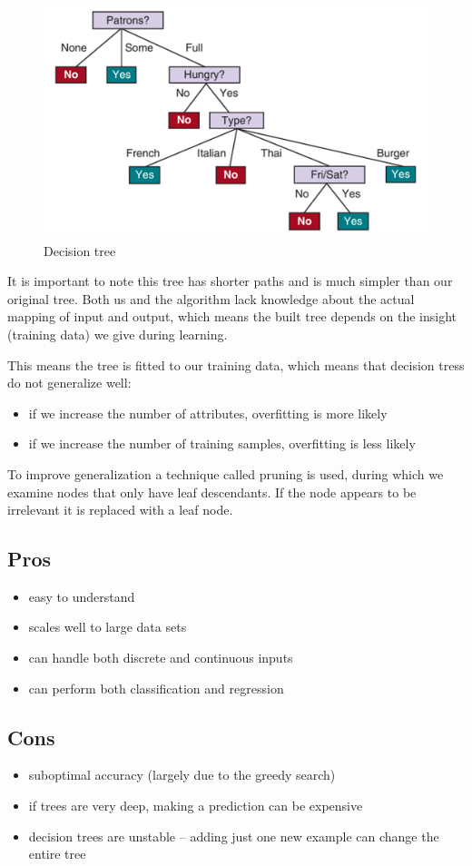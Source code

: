 \documentclass[a4paper,12pt,answers]{article}
\begin{document}
	\begin{figure}[H]
		\centering
		\includegraphics[width=0.7\linewidth]{dec_tree_building2}
		\caption{Decision tree}
		\label{fig:dectreebuilding2}
	\end{figure}
	It is important to note this tree has shorter paths and is much simpler than our original tree. Both us and the algorithm lack knowledge about the actual mapping of input and output, which means the built tree depends on the insight (training data) we give during learning.
	
	This means the tree is fitted to our training data, which means that decision tress do not generalize well:
	\begin{itemize}
		\item if we increase the number of attributes, overfitting is more likely
		\item if we increase the number of training samples, overfitting is less likely
	\end{itemize}
	
	To improve generalization a technique called pruning is used, during which we examine nodes that only have leaf descendants. If the node appears to be irrelevant it is replaced with a leaf node.
	
	\subsection{Pros}
	\begin{itemize}
		\item easy to understand
		\item scales well to large data sets
		\item can handle both discrete and continuous inputs
		\item can perform both classification and regression
	\end{itemize}
	
	\subsection{Cons}
	\begin{itemize}
		\item suboptimal accuracy (largely due to the greedy search)
		\item if trees are very deep, making a prediction can be expensive 
		\item decision trees are unstable – adding just one new example can change the entire tree
	\end{itemize}
	
\end{document}
